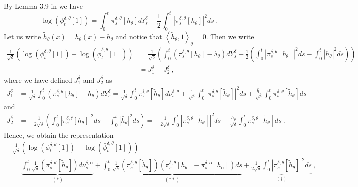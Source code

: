\documentclass{article}
\begin{document}
By Lemma 3.9 in \cite{bainCrisan} we have
\[\log\left( \phi_t^{\delta,\theta}[1]\right) = \int_0^t \pi_s^{\delta,\theta}[h_{\theta}]dY^{\delta}_s -\frac 12\int_0^t\left| \pi_s^{\delta,\theta}[h_{\theta}]\right|^2ds\ .\]
Let us write $\tilde{h}_{\theta}(x)=h_{\theta}(x)-\bar{h}_{\theta}$ and notice that $\left<\tilde{h}_{\theta},1\right>_{\theta}=0$. Then we write
\begin{align}
\frac{1}{\sqrt\delta}\left(\log\left( \phi_t^{\delta,\theta}[1]\right)-\log\left( \bar\phi_t^{\delta,\theta}[1]\right)\right)&= \frac{1}{\sqrt\delta}\left(\int_0^t\left( \pi_s^{\delta,\theta}[h_{\theta}]-\bar h_{\theta}\right)dY_s^\delta -\frac 12\left(\int_0^t\left| \pi_s^{\delta,\theta}[h_{\theta}]\right|^2ds-\int_0^t\left| \bar h_{\theta}\right|^2ds\right)\right)\nonumber\\
&=J^{\delta}_{1}+ J^{\delta}_{2}\ ,\nonumber
\end{align}
where we have defined $J_1^\delta$ and $J_2^\delta$ as
\begin{align}
J^{\delta}_{1}&=\frac{1}{\sqrt\delta}\int_0^t\left( \pi_s^{\delta,\theta}[h_{\theta}]-\bar h_{\theta}\right)dY_s^\delta=\frac{1}{\sqrt\delta}\int_0^t \pi_s^{\delta,\theta}[\tilde{h}_{\theta}]d\nu_s^{\delta,\theta}+
\frac{1}{\sqrt\delta}\int_0^t\left| \pi_s^{\delta,\theta}[\tilde h_{\theta}]\right|^2ds+\frac{\bar{h}_{\theta}}{\sqrt\delta}\int_0^t \pi_s^{\delta,\theta}[\tilde h_{\theta}]ds\nonumber
\end{align}
and
\begin{align}
J^{\delta}_{2}&=-\frac{1}{2\sqrt{\delta}}\left(\int_0^t\left| \pi_s^{\delta,\theta}[h_{\theta}]\right|^2ds-\int_0^t\left| \bar h_{\theta}\right|^2ds\right)=-\frac{1}{2\sqrt{\delta}}\int_0^t\left| \pi_s^{\delta,\theta}[\tilde{h}_{\theta}]\right|^2ds-\frac{\bar h_{\theta}}{\sqrt{\delta}}\int_0^t  \pi_s^{\delta,\theta}[\tilde{h}_{\theta}] ds\ .\nonumber
\end{align}
Hence, we obtain the representation
\begin{align}
\nonumber
&\frac{1}{\sqrt\delta}\left(\log\left( \phi_t^{\delta,\theta}[1]\right)-\log\left( \bar\phi_t^{\delta,\theta}[1]\right)\right)\\
\label{eq:logLderiv}
&=\underbrace{\int_0^t\frac{1}{\sqrt\delta}\left( \pi_s^{\delta,\theta}[\tilde h_{\theta}]\right)d\nu_s^{\delta,\alpha}}_{(*)}+\underbrace{\int_0^t\frac{1}{\sqrt\delta}\left( \pi_s^{\delta,\theta}[\tilde h_{\theta}]\right)\left(\pi_s^{\delta,\theta}[h_{\theta}]-\pi_s^{\delta,\alpha}[h_{\alpha}]\right)ds}_{(**)}+\underbrace{\frac{1}{2\sqrt\delta}\int_0^t\left| \pi_s^{\delta,\theta}[\tilde h_{\theta}]\right|^2ds}_{(\dagger)}\ ,
\end{align}
\end{document}
